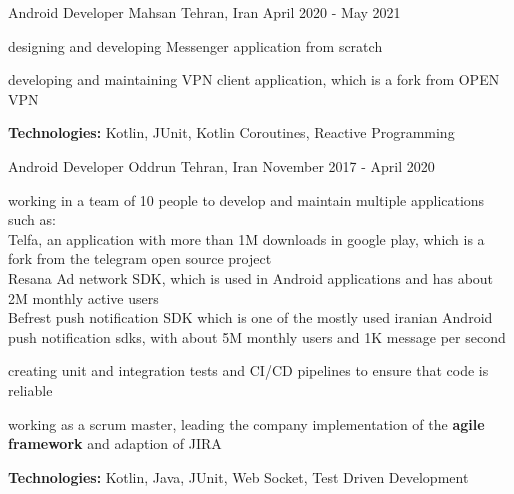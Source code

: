 \begin{cventries}
    \cventry
    {Android Developer} %
    {Mahsan} %
    {Tehran, Iran} %
    {April 2020 - May 2021} %
    {
      \begin{cvitems} %
        \item designing and developing Messenger application from scratch
        \item developing and maintaining VPN client application, which is a fork from OPEN VPN
        \item \textbf{Technologies:} Kotlin, JUnit, Kotlin Coroutines, Reactive Programming
      \end{cvitems}
    }

    \cventry
    {Android Developer} %
    {Oddrun} %
    {Tehran, Iran} %
    {November 2017 - April 2020} %
    { 
      \begin{cvitems} %
        \item working in a team of 10 people to develop and maintain multiple applications such as: 
        \\ Telfa, an application with more than 1M downloads in google play, which is a fork from the telegram open source project
        \\ Resana Ad network SDK, which is used in Android applications and has about 2M monthly active users
        \\ Befrest push notification SDK which is one of the mostly used iranian Android push notification sdks, with about 5M monthly users and 1K message per second
        \item creating unit and integration tests and CI/CD pipelines to ensure that code is reliable
        \item working as a scrum master, leading the company implementation of the \textbf{agile framework} and adaption of JIRA
        \item \textbf{Technologies:} Kotlin, Java, JUnit, Web Socket, Test Driven Development
      \end{cvitems}
    }

\end{cventries}
